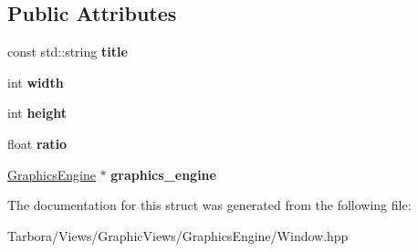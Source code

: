 \subsection*{Public Attributes}
\begin{DoxyCompactItemize}
\item 
\mbox{\label{structTarbora_1_1WindowProps_ab7ecd07ea6ad0bb15dc3aec6ffc7b5f5}} 
const std\+::string {\bfseries title}
\item 
\mbox{\label{structTarbora_1_1WindowProps_aa95a93cc65364a483c4cb509d43e8fd8}} 
int {\bfseries width}
\item 
\mbox{\label{structTarbora_1_1WindowProps_a6896cbaf94f4aac92eeb8cb95291c67c}} 
int {\bfseries height}
\item 
\mbox{\label{structTarbora_1_1WindowProps_a57f0dee710d4838d5bbfb08245fe5654}} 
float {\bfseries ratio}
\item 
\mbox{\label{structTarbora_1_1WindowProps_ac05b4951279ae357b09d539c4e6fdcd9}} 
\hyperlink{classTarbora_1_1GraphicsEngine}{Graphics\+Engine} $\ast$ {\bfseries graphics\+\_\+engine}
\end{DoxyCompactItemize}


The documentation for this struct was generated from the following file\+:\begin{DoxyCompactItemize}
\item 
Tarbora/\+Views/\+Graphic\+Views/\+Graphics\+Engine/Window.\+hpp\end{DoxyCompactItemize}
